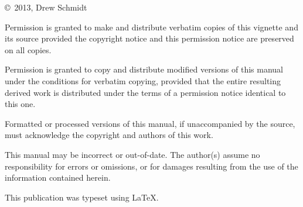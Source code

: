 
\null
\vfill
\copyright\ 2013, Drew Schmidt

Permission is granted to make and distribute verbatim copies of
this vignette and its source provided the copyright notice and
this permission notice are preserved on all copies.

Permission is granted to copy and distribute modified versions of
this manual under the conditions for verbatim copying, provided that
the entire resulting derived work is distributed under the terms of
a permission notice identical to this one.

Formatted or processed versions of this manual, if unaccompanied by
the source, must acknowledge the copyright and authors of this work.

This manual may be incorrect or out-of-date.  The author(s) assume
no responsibility for errors or omissions, or for damages resulting
from the use of the information contained herein.

This publication was typeset using \LaTeX.

